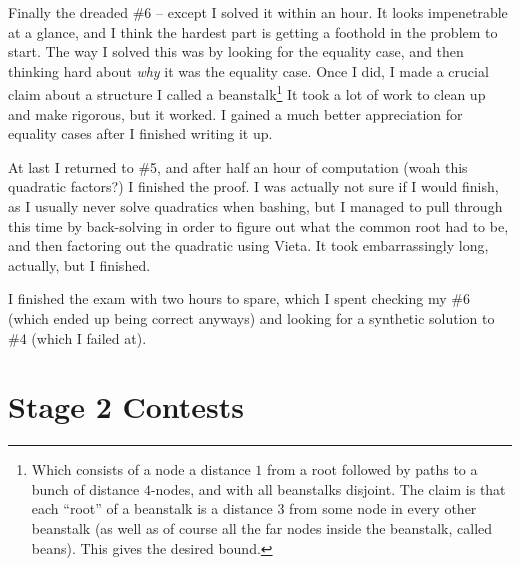 \documentclass[11pt]{scrreprt}
\begin{document}
Finally the dreaded \#6 -- except I solved it within an hour. It looks impenetrable at a glance, and I think the hardest part is getting a foothold in the problem to start. The way I solved this was by looking for the equality case, and then thinking hard about \emph{why} it was the equality case. Once I did, I made a crucial claim about a structure I called a beanstalk\footnote{Which consists of a node a distance $1$ from a root followed by paths to a bunch of distance $4$-nodes, and with all beanstalks disjoint. The claim is that each ``root'' of a beanstalk is a distance $3$ from some node in every other beanstalk (as well as of course all the far nodes inside the beanstalk, called beans). This gives the desired bound.} It took a lot of work to clean up and make rigorous, but it worked. I gained a much better appreciation for equality cases after I finished writing it up.

At last I returned to \#5, and after half an hour of computation (woah this quadratic factors?) I finished the proof. I was actually not sure if I would finish, as I usually never solve quadratics when bashing, but I managed to pull through this time by back-solving in order to figure out what the common root had to be, and then factoring out the quadratic using Vieta. It took embarrassingly long, actually, but I finished.

I finished the exam with two hours to spare, which I spent checking my \#6 (which ended up being correct anyways) and looking for a synthetic solution to \#4 (which I failed at).

\section{Stage 2 Contests}
\end{document}
